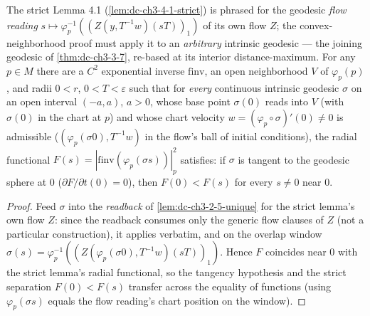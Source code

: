 \begin{lemma}
  \label{lem:dc-ch3-4-2-rebase}


  The strict Lemma 4.1 (\cref{lem:dc-ch3-4-1-strict}) is phrased for the geodesic
  \emph{flow reading} $s\mapsto\varphi_p^{-1}((Z(y,T^{-1}w)(sT))_1)$ of its own flow $Z$;
  the convex-neighborhood proof must apply it to an \emph{arbitrary} intrinsic geodesic — the
  joining geodesic of \cref{thm:dc-ch3-3-7}, re-based at its interior distance-maximum. For any
  $p\in M$ there are a $C^2$ exponential inverse $\mathrm{finv}$, an open neighborhood $V$ of
  $\varphi_p(p)$, and radii $0<r$, $0<T<\varepsilon$ such that for \emph{every} continuous
  intrinsic geodesic $\sigma$ on an open interval $(-a,a)$, $a>0$, whose base point $\sigma(0)$
  reads into $V$ (with $\sigma(0)$ in the chart at $p$) and whose chart velocity
  $w=(\varphi_p\circ\sigma)'(0)\neq0$ is admissible ($(\varphi_p(\sigma 0),T^{-1}w)$ in the flow's
  ball of initial conditions), the radial functional $F(s)=|\mathrm{finv}(\varphi_p(\sigma s))|_p^2$
  satisfies: if $\sigma$ is tangent to the geodesic sphere at $0$ ($\partial F/\partial t(0)=0$),
  then $F(0)<F(s)$ for every $s\neq0$ near $0$.
\end{lemma}
\begin{proof}
  \sketch

  Feed $\sigma$ into the \emph{readback} of \cref{lem:dc-ch3-2-5-unique} for the strict
  lemma's own flow $Z$: since
  the readback consumes only the generic flow clauses of $Z$ (not a particular construction), it
  applies verbatim, and on the overlap window $\sigma(s)=\varphi_p^{-1}((Z(\varphi_p(\sigma 0),
  T^{-1}w)(sT))_1)$. Hence $F$ coincides near $0$ with the strict lemma's radial functional, so
  the tangency hypothesis and the strict separation $F(0)<F(s)$ transfer across the equality of
  functions (using $\varphi_p(\sigma s)$ equals the flow reading's chart position on the window).

\end{proof}

